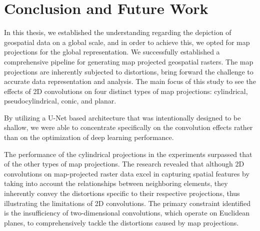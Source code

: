
\clearpage
\cleardoublepage

\chapter{Conclusion and Future Work}
\label{chap:conclusion_future_work}
In this thesis, we established the understanding regarding the depiction of geospatial data on a global scale, and in order to achieve this, we opted for map projections for the global representation.
We successfully established a comprehensive pipeline for generating map projected geospatial rasters. The map projections are inherently subjected to distortions, bring forward the challenge to accurate data representation and analysis.
The main focus of this study to see the effects of 2D convolutions on four distinct types of map projections: cylindrical, pseudocylindrical, conic, and planar.

By utilizing a U-Net based architecture that was intentionally designed to be shallow, we were able to concentrate specifically on the convolution effects rather than on the optimization of deep learning performance.

The performance of the cylindrical projections in the experiments surpassed that of the other types of map projections.
The research revealed that although 2D convolutions on map-projected raster data excel in capturing spatial features by taking into account the relationships between neighboring elements,
they inherently convey the distortions specific to their respective projections, thus illustrating the limitations of 2D convolutions. The primary constraint identified is the insufficiency of two-dimensional convolutions, which operate on Euclidean planes, to comprehensively tackle the distortions caused by map projections.
